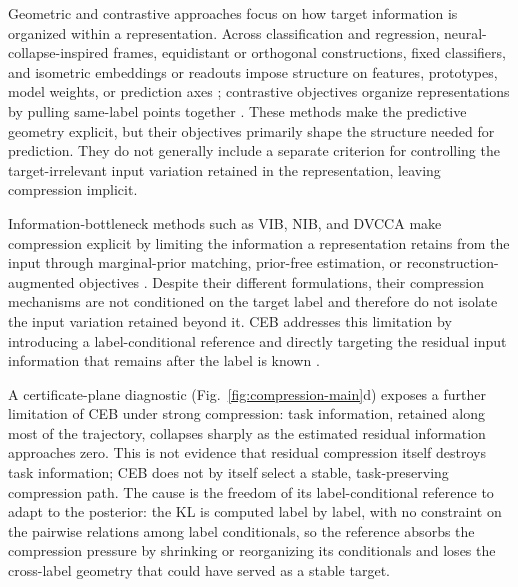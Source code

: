 \documentclass{article} %
\theoremstyle{plain}
\theoremstyle{remark}
\begin{document}
Geometric and contrastive approaches focus on how target information is organized
within a representation. Across classification and regression,
neural-collapse-inspired frames, equidistant or orthogonal constructions, fixed
classifiers, and isometric embeddings or readouts impose structure on features,
prototypes, model weights, or prediction axes
\citep{papyan2020prevalence,deng2014equidistant,xu2022orthogonal,tong2023fixed_frame,
pai2022isometric,luo2023doll}; contrastive objectives organize representations by
pulling same-label points together \citep{koromilas2026neural,belucci2026adacap}.
These methods make the predictive geometry explicit, but their objectives
primarily shape the structure needed for prediction. They do not generally
include a separate
criterion for controlling the target-irrelevant input variation retained in the
representation, leaving compression implicit.

Information-bottleneck methods such as VIB, NIB, and DVCCA make compression
explicit by limiting the information a representation retains from the input
through marginal-prior matching, prior-free estimation, or reconstruction-augmented
objectives \citep{alemi2017deep,kolchinsky2017nonlinear,abdelaleem2025deep}.
Despite their different formulations, their compression mechanisms are not
conditioned on the target label and therefore do not isolate the input variation
retained beyond it. CEB addresses this limitation by introducing a
label-conditional reference and directly targeting the residual input information
that remains after the label is known \citep{fischer2020conditional}.

A certificate-plane diagnostic (Fig.~\ref{fig:compression-main}d) exposes a further
limitation of CEB under strong compression: task information, retained along most of
the trajectory, collapses sharply as the estimated residual information approaches
zero. This is not evidence that residual compression itself destroys task
information; CEB does not by itself select a stable, task-preserving compression
path. The cause is the freedom of its label-conditional reference to adapt to the
posterior: the KL is computed label by label, with no constraint on the pairwise
relations among label conditionals, so the reference absorbs the compression pressure
by shrinking or reorganizing its conditionals and loses the cross-label geometry that
could have served as a stable target.
\end{document}
